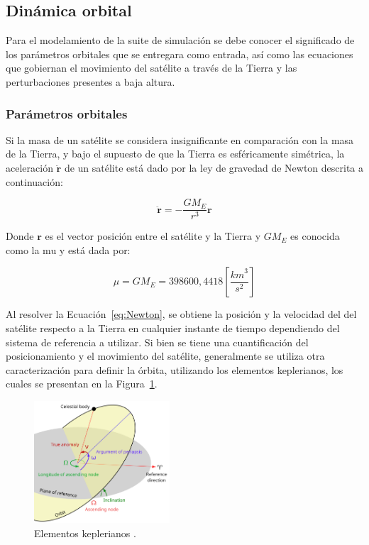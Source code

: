 \subsection{Dinámica orbital}

Para el modelamiento de la suite de simulación se debe conocer el significado de los parámetros orbitales que se entregara como entrada, así como las ecuaciones que gobiernan el movimiento del satélite a través de la Tierra y las perturbaciones presentes a baja altura.

\subsubsection{Parámetros orbitales}

Si la masa de un satélite se considera insignificante en comparación con la masa de la Tierra, y bajo el supuesto de que la Tierra es esféricamente simétrica, la aceleración \( \ddot{\mathbf{r}} \) de un satélite está dado por la ley de gravedad de Newton descrita a continuación:

\begin{equation}
	\ddot{\mathbf{r}} = -\frac{GM_E}{r^3} \mathbf{r}
	\label{eq:Newton}
\end{equation}

Donde $\mathbf{r}$ es el vector posición entre el satélite y la Tierra y $GM_E$ es conocida como la \gls{mu} y está dada por:

\begin{equation}
	\mu = {GM_E} = 398600,4418  [\frac{{km}^3}{{s}^2}]
	\label{eq:cteGrav}
\end{equation}

Al resolver la Ecuación~\ref{eq:Newton}, se obtiene la posición y la velocidad del del satélite respecto a la Tierra en cualquier instante de tiempo dependiendo del sistema de referencia a utilizar. Si bien se tiene una cuantificación del posicionamiento y el movimiento del satélite, generalmente se utiliza otra caracterización para definir la órbita, utilizando los elementos keplerianos, los cuales se presentan en la Figura~\ref{fig:kepler}.

\begin{figure}[H]
	\centering    
	\includegraphics[width=0.45\textwidth]{keplerianos.png}
	\caption{Elementos keplerianos \cite{ref24}.}
	\label{fig:kepler}
\end{figure}

